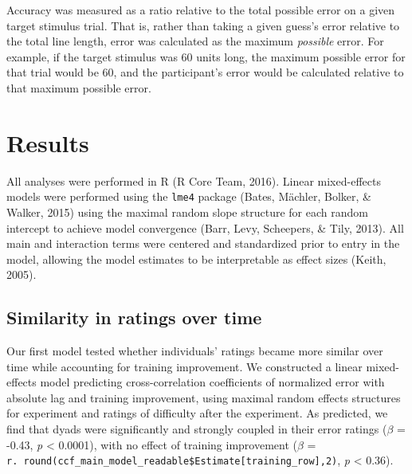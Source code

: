 \documentclass[10pt, letterpaper]{article}
\begin{document}
Accuracy was measured as a ratio relative to the total possible error on
a given target stimulus trial. That is, rather than taking a given
guess's error relative to the total line length, error was calculated as
the maximum \emph{possible} error. For example, if the target stimulus
was 60 units long, the maximum possible error for that trial would be
60, and the participant's error would be calculated relative to that
maximum possible error.

\section{Results}\label{results}

All analyses were performed in R (R Core Team, 2016). Linear
mixed-effects models were performed using the \texttt{lme4} package
(Bates, Mächler, Bolker, \& Walker, 2015) using the maximal random slope
structure for each random intercept to achieve model convergence (Barr,
Levy, Scheepers, \& Tily, 2013). All main and interaction terms were
centered and standardized prior to entry in the model, allowing the
model estimates to be interpretable as effect sizes (Keith, 2005).

\subsection{Similarity in ratings over
time}\label{similarity-in-ratings-over-time}

Our first model tested whether individuals' ratings became more similar
over time while accounting for training improvement. We constructed a
linear mixed-effects model predicting cross-correlation coefficients of
normalized error with absolute lag and training improvement, using
maximal random effects structures for experiment and ratings of
difficulty after the experiment. As predicted, we find that dyads were
significantly and strongly coupled in their error ratings
(\emph{\(\beta\)} = -0.43, \emph{p} \textless{} 0.0001), with no effect
of training improvement (\emph{\(\beta\)} =
\texttt{r.\ round(ccf\_main\_model\_readable\$Estimate{[}training\_row{]},2)},
\emph{p} \textless{} 0.36).
\end{document}
